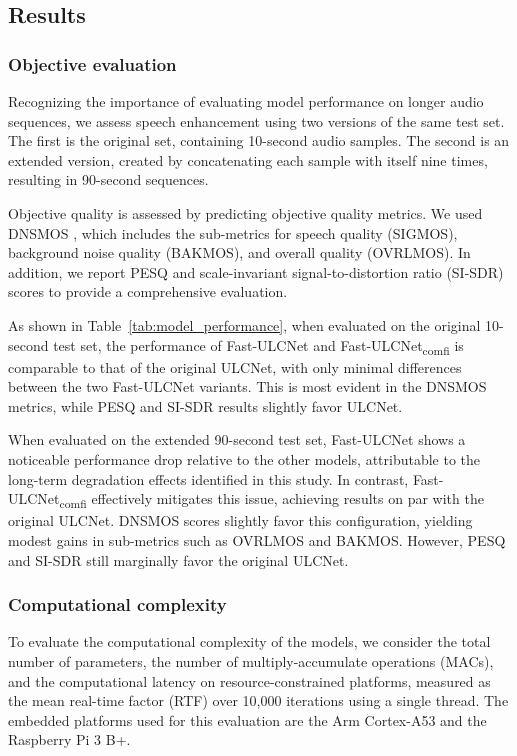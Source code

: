 \documentclass[9pt]{article}
\begin{document}
\subsection{Results}
\label{ssec:results}

\subsubsection{Objective evaluation}
\label{sssec:objective_eval}

Recognizing the importance of evaluating model performance on longer audio sequences, we assess speech enhancement using two versions of the same test set. The first is the original set, containing 10-second audio samples. The second is an extended version, created by concatenating each sample with itself nine times, resulting in 90-second sequences.

Objective quality is assessed by predicting objective quality metrics. We used DNSMOS \cite{C13}, which includes the sub-metrics for speech quality (SIGMOS), background noise quality (BAKMOS), and overall quality (OVRLMOS). In addition, we report PESQ \cite{C14} and scale-invariant signal-to-distortion ratio (SI-SDR) \cite{C15} scores to provide a comprehensive evaluation.

As shown in Table~\ref{tab:model_performance}, when evaluated on the original 10-second test set, the performance of Fast-ULCNet and Fast-ULCNet\textsubscript{comfi} is comparable to that of the original ULCNet, with only minimal differences between the two Fast-ULCNet variants. This is most evident in the DNSMOS metrics, while PESQ and SI-SDR results slightly favor ULCNet.

When evaluated on the extended 90-second test set, Fast-ULCNet shows a noticeable performance drop relative to the other models, attributable to the long-term degradation effects identified in this study. In contrast, Fast-ULCNet\textsubscript{comfi} effectively mitigates this issue, achieving results on par with the original ULCNet. DNSMOS scores slightly favor this configuration, yielding modest gains in sub-metrics such as OVRLMOS and BAKMOS. However, PESQ and SI-SDR still marginally favor the original ULCNet.

\subsubsection{Computational complexity}
\label{sssec:RTF-analysis}

To evaluate the computational complexity of the models, we consider the total number of parameters, the number of multiply-accumulate operations (MACs), and the computational latency on resource-constrained platforms, measured as the mean real-time factor (RTF) over 10,000 iterations using a single thread. The embedded platforms used for this evaluation are the Arm Cortex-A53 and the Raspberry Pi 3 B+.
\end{document}
